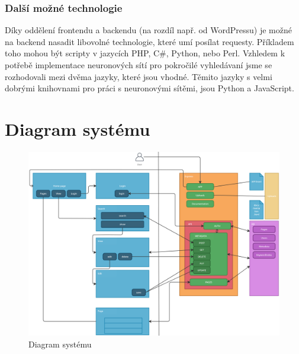 \subsubsection{Další možné technologie}
Díky oddělení frontendu a backendu (na rozdíl např. od WordPressu) je možné
na backend nasadit libovolné technologie, které umí posílat requesty.
Příkladem toho mohou být scripty v jazycích PHP, C\#, Python, nebo Perl.
Vzhledem k potřebě implementace neuronových sítí pro pokročilé vyhledávaní
jsme se rozhodovali mezi dvěma jazyky, které jsou vhodné. Těmito jazyky
s velmi dobrými knihovnami pro práci s neuronovými sítěmi, jsou
Python a JavaScript.

\section{Diagram systému}
\begin{figure}[H]
	\centering
	\includegraphics[angle=90,origin=c,width=\linewidth]{img/diagram.png}
	\caption{Diagram systému}
\end{figure}
